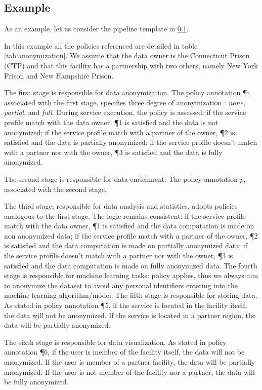 \subsection{Example}\label{sec:example}


As an example, let us consider the pipeline template \tChartFunction in \cref{sec:example}.

In this example all the policies referenced are detailed in table \ref{tab:anonymization}.
We assume that the data owner is the Connecticut Prison (CTP) and that this facility has a partnership with two others, namely New York Prison and New Hampshire Prison.

The first stage is responsible for data anonymization. The  policy annotation \P{i}, associated with the first stage,
specifies three degree of anonymization : \emph{none}, \emph{partial}, and \emph{full}.
During service execution, the policy is assessed:
if the service profile match with the data owner, \P{1} is satisfied and the data is not anonymized;
if the service profile match with a partner of the owner, \P{2} is satisfied and the data is partially anonymized;
if the service profile doesn't match with a partner nor with the owner, \P{3} is satisfied and the data is fully anonymized.

The second stage is responsible for data enrichment. The policy annotation $p$, associated with the second stage,

The third stage, responsible for data analysis and statistics, adopts policies analogous to the first stage. The logic remains consistent:
if the service profile match with the data owner, \P{1} is satisfied and the data computation is made on non anonymized data;
if the service profile match with a partner of the owner, \P{2} is satisfied and the data computation is made on partially anonymized data;
if the service profile doesn't match with a partner nor with the owner, \P{3} is satisfied and the data computation is made on fully anonymized data.
The fourth stage is responsible for machine learning tasks:
policy  applies, thus we always aim to anonymize the dataset to avoid any personal identifiers entering into the machine learning algorithm/model.
The fifth stage is responsible for storing data. As stated in policy annotation \P{5}, if the service is located in the facility itself, the data will not be anonymized.
If the service is located in a partner region, the data will be partially anonymized.

The sixth stage is responsible for data visualization. As stated in policy annotation \P{6}, if the user is member of the facility itself, the data will not be anonymized.
If the user is member of a partner facility, the data will be partially anonymized.
If the user is not member of the facility nor a partner, the data will be fully anonymized.





